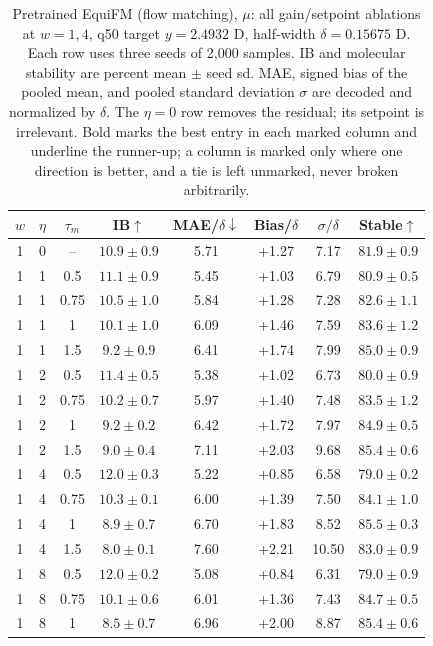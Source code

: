 \documentclass{article}
\begin{document}
\begin{table}[!htbp]
\centering\small
\caption{Pretrained EquiFM (flow matching), $\mu$: all gain/setpoint ablations at $w=1,4$, q50 target $y=2.4932$ D, half-width $\delta=0.15675$ D. Each row uses three seeds of 2,000 samples. IB and molecular stability are percent mean $\pm$ seed sd. MAE, signed bias of the pooled mean, and pooled standard deviation $\sigma$ are decoded and normalized by $\delta$. The $\eta=0$ row removes the residual; its setpoint is irrelevant. Bold marks the best entry in each marked column and underline the runner-up; a column is marked only where one direction is better, and a tie is left unmarked, never broken arbitrarily.}
\label{tab:grid-equifm-mu}
\begin{tabular}{cccccccc}
\toprule
$w$ & $\eta$ & $\tau_m$ & IB$\uparrow$ & MAE/$\delta\downarrow$ & Bias/$\delta$ & $\sigma/\delta$ & Stable$\uparrow$\\
\midrule
1 & 0 & -- & $10.9\pm0.9$ & 5.71 & +1.27 & 7.17 & $81.9\pm0.9$\\
1 & 1 & 0.5 & $11.1\pm0.9$ & 5.45 & +1.03 & 6.79 & $80.9\pm0.5$\\
1 & 1 & 0.75 & $10.5\pm1.0$ & 5.84 & +1.28 & 7.28 & $82.6\pm1.1$\\
1 & 1 & 1 & $10.1\pm1.0$ & 6.09 & +1.46 & 7.59 & $83.6\pm1.2$\\
1 & 1 & 1.5 & $9.2\pm0.9$ & 6.41 & +1.74 & 7.99 & $85.0\pm0.9$\\
1 & 2 & 0.5 & $11.4\pm0.5$ & 5.38 & +1.02 & 6.73 & $80.0\pm0.9$\\
1 & 2 & 0.75 & $10.2\pm0.7$ & 5.97 & +1.40 & 7.48 & $83.5\pm1.2$\\
1 & 2 & 1 & $9.2\pm0.2$ & 6.42 & +1.72 & 7.97 & $84.9\pm0.5$\\
1 & 2 & 1.5 & $9.0\pm0.4$ & 7.11 & +2.03 & 9.68 & $85.4\pm0.6$\\
1 & 4 & 0.5 & $12.0\pm0.3$ & 5.22 & +0.85 & 6.58 & $79.0\pm0.2$\\
1 & 4 & 0.75 & $10.3\pm0.1$ & 6.00 & +1.39 & 7.50 & $84.1\pm1.0$\\
1 & 4 & 1 & $8.9\pm0.7$ & 6.70 & +1.83 & 8.52 & $85.5\pm0.3$\\
1 & 4 & 1.5 & $8.0\pm0.1$ & 7.60 & +2.21 & 10.50 & $83.0\pm0.9$\\
1 & 8 & 0.5 & $12.0\pm0.2$ & 5.08 & +0.84 & 6.31 & $79.0\pm0.9$\\
1 & 8 & 0.75 & $10.1\pm0.6$ & 6.01 & +1.36 & 7.43 & $84.7\pm0.5$\\
1 & 8 & 1 & $8.5\pm0.7$ & 6.96 & +2.00 & 8.87 & $85.4\pm0.6$\\

\end{tabular}
\end{table}
\end{document}

